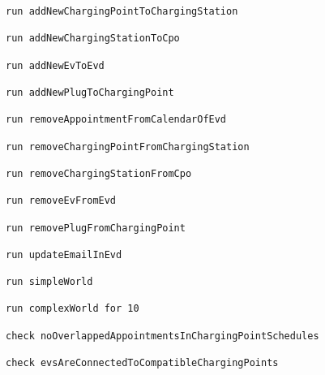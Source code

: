 \begin{lstlisting}[language=alloy]
run addNewChargingPointToChargingStation

run addNewChargingStationToCpo

run addNewEvToEvd

run addNewPlugToChargingPoint

run removeAppointmentFromCalendarOfEvd

run removeChargingPointFromChargingStation

run removeChargingStationFromCpo

run removeEvFromEvd

run removePlugFromChargingPoint

run updateEmailInEvd

run simpleWorld

run complexWorld for 10

check noOverlappedAppointmentsInChargingPointSchedules

check evsAreConnectedToCompatibleChargingPoints

\end{lstlisting}
